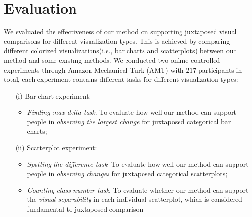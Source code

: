 \section {Evaluation}
\label{sec:results}

We evaluated the effectiveness of our method on supporting juxtaposed visual comparisons for different visualization types.
This is achieved by comparing different colorized visualizations(i.e., bar charts and scatterplots) between our method and some existing methods.
We conducted two online controlled experiments through Amazon Mechanical Turk (AMT) with $217$ participants in total, each experiment contains different tasks for different visualization types:
\begin{enumerate}
\item [(i)] Bar chart experiment:
    \begin{itemize}
         \item \emph{Finding max delta task}. To evaluate how well our method can support people in \emph{observing the largest change} for juxtaposed categorical bar charts;
    \end{itemize}
\item [(ii)] Scatterplot experiment:
    \begin{itemize}
         \item \emph{Spotting the difference task}. To evaluate how well our method can support people in \emph{observing changes} for juxtaposed categorical scatterplots;
         \item \emph{Counting class number task}. To evaluate whether our method can support the \emph{visual separability} in each individual scatterplot, which is considered fundamental to juxtaposed comparison.
    \end{itemize}
\end{enumerate}

